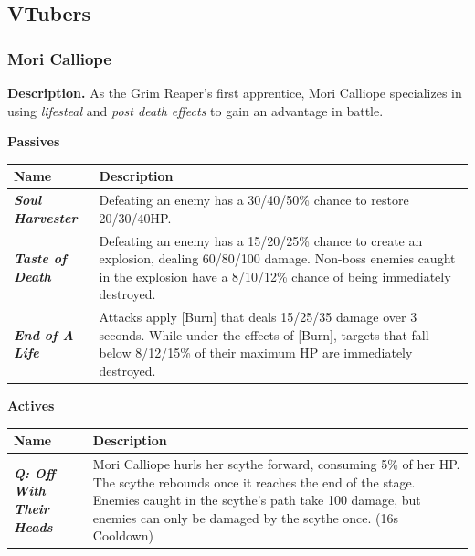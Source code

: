 \documentclass[10pt, a4paper]{article}
\begin{document}
\begin{multicols}{2}
	\subsection{VTubers} \label{VTubers}
  	
  	\subsubsection{Mori Calliope}
  	
  	\textbf{Description.} As the Grim Reaper's first apprentice, Mori Calliope specializes in using \textit{lifesteal} and \textit{post death effects} to gain an advantage in battle.

	\textbf{Passives}
	
	\begin{center}
		\begin{tabular}{|p{2.7cm}|p{5.5cm}|}
			\hline
			\textbf{Name} & \textbf{Description} \\
			\hline

			\textit{\textbf{Soul Harvester}} & Defeating an enemy has a 30/40/50\% chance to restore 20/30/40HP. \\

			\textit{\textbf{Taste of Death}} & Defeating an enemy has a 15/20/25\% chance to create an explosion, dealing 60/80/100 damage. Non-boss enemies caught in the explosion have a 8/10/12\% chance of being immediately destroyed. \\
		
			\textit{\textbf{End of A Life}}  & Attacks apply [Burn] that deals 15/25/35 damage over 3 seconds. While under the effects of [Burn], targets that fall below 8/12/15\% of their maximum HP are immediately destroyed. \\
			\hline
			
		\end{tabular}
	\end{center}
	
	\begin{center}
		\textbf{Actives}
	\end{center}
	
	\begin{center}
		\begin{tabular}{|p{2.7cm}|p{5.5cm}|}
			\hline
			\textbf{Name} & \textbf{Description} \\
			\hline

			\textit{\textbf{Q: Off With Their Heads}} & Mori Calliope hurls her scythe forward, consuming 5\% of her HP. The scythe rebounds once it reaches the end of the stage. Enemies caught in the scythe's path take 100 damage, but enemies can only be damaged by the scythe once. (16s Cooldown)\\


\end{tabular}
\end{center}
\end{multicols}
\end{document}
